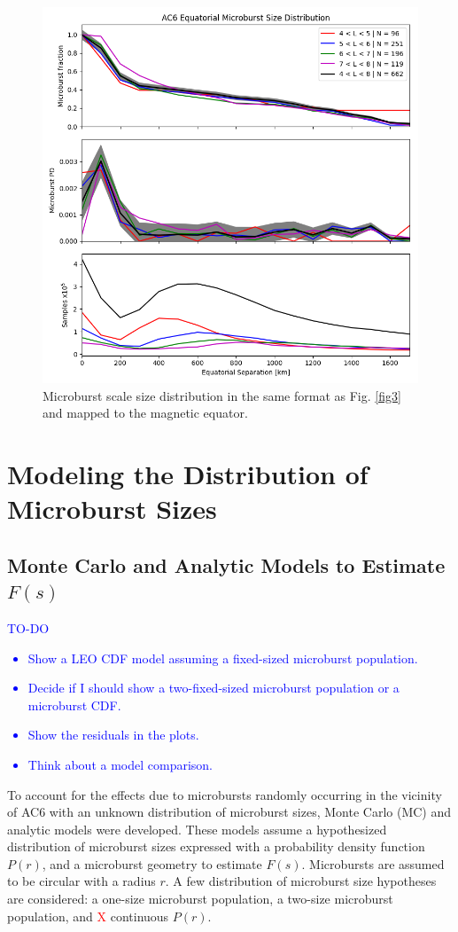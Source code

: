 \documentclass[draft]{agujournal2019}
\begin{document}
\begin{figure}
\includegraphics[width=\textwidth]{fig4.png}
\caption{Microburst scale size distribution in the same format as Fig. \ref{fig3} and mapped to the magnetic equator.} 
\label{fig4}
\end{figure}

\section{Modeling the Distribution of Microburst Sizes}
\subsection{Monte Carlo and Analytic Models to Estimate $F(s)$}
\textcolor{blue}{
TO-DO
\begin{itemize}
\item Show a LEO CDF model assuming a fixed-sized microburst population.
\item Decide if I should show a two-fixed-sized microburst population or a microburst CDF.
\item Show the residuals in the plots.
\item Think about a model comparison.
\end{itemize}
}

To account for the effects due to microbursts randomly occurring in the vicinity of AC6 with an unknown distribution of microburst sizes, Monte Carlo (MC) and analytic models were developed. These models assume a hypothesized distribution of microburst sizes expressed with a probability density function $P(r)$, and a microburst geometry to estimate $F(s)$. Microbursts are assumed to be circular with a radius $r$. A few distribution of microburst size hypotheses are considered: a one-size microburst population, a two-size microburst population, and \textcolor{red}{X} continuous $P(r)$.
\end{document}

